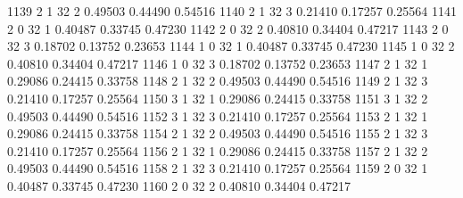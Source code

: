 \documentclass{article}
\begin{document}
\begin{Woutput}
1139      2       1      32       2       0.49503    0.44490    0.54516
1140      2       1      32       3       0.21410    0.17257    0.25564
1141      2       0      32       1       0.40487    0.33745    0.47230
1142      2       0      32       2       0.40810    0.34404    0.47217
1143      2       0      32       3       0.18702    0.13752    0.23653
1144      1       0      32       1       0.40487    0.33745    0.47230
1145      1       0      32       2       0.40810    0.34404    0.47217
1146      1       0      32       3       0.18702    0.13752    0.23653
1147      2       1      32       1       0.29086    0.24415    0.33758
1148      2       1      32       2       0.49503    0.44490    0.54516
1149      2       1      32       3       0.21410    0.17257    0.25564
1150      3       1      32       1       0.29086    0.24415    0.33758
1151      3       1      32       2       0.49503    0.44490    0.54516
1152      3       1      32       3       0.21410    0.17257    0.25564
1153      2       1      32       1       0.29086    0.24415    0.33758
1154      2       1      32       2       0.49503    0.44490    0.54516
1155      2       1      32       3       0.21410    0.17257    0.25564
1156      2       1      32       1       0.29086    0.24415    0.33758
1157      2       1      32       2       0.49503    0.44490    0.54516
1158      2       1      32       3       0.21410    0.17257    0.25564
1159      2       0      32       1       0.40487    0.33745    0.47230
1160      2       0      32       2       0.40810    0.34404    0.47217


\end{Woutput}
\end{document}
